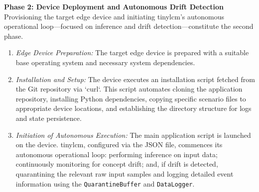 \textbf{Phase 2: Device Deployment and Autonomous Drift Detection}
Provisioning the target edge device and initiating \gls{tinylcm}'s autonomous operational loop—focused on inference and drift detection—constitute the second phase.
\begin{enumerate}
    \item \textit{Edge Device Preparation:} The target edge device is prepared with a suitable base operating system and necessary system dependencies.
    \item \textit{Installation and Setup:} The device executes an installation script fetched from the Git repository via `curl`. This script automates cloning the application repository, installing Python dependencies, copying specific scenario files to appropriate device locations, and establishing the directory structure for logs and state persistence.
    \item \textit{Initiation of Autonomous Execution:} The main application script is launched on the device. \gls{tinylcm}, configured via the JSON file, commences its autonomous operational loop: performing inference on input data; continuously monitoring for concept drift; and, if drift is detected, quarantining the relevant raw input samples and logging detailed event information using the \texttt{QuarantineBuffer} and \texttt{DataLogger}.
\end{enumerate}

